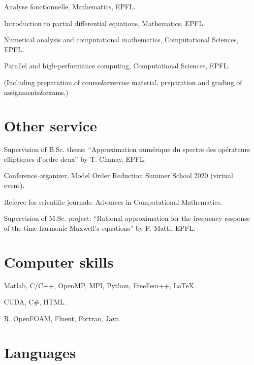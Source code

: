 \documentclass[11pt]{article} %
\begin{document}
\yearsminus Analyse fonctionnelle, Mathematics, EPFL.

Introduction to partial differential equations, Mathematics, EPFL.

Numerical analysis and computational mathematics, Computational Sciences, EPFL.

Parallel and high-performance computing, Computational Sciences, EPFL.

\smallskip

\hspace{-\leftskip}(Including preparation of course\&exercise material, preparation and grading of assignments\&exams.)

\section*{Other service}

\hspace{\parindent}Supervision of B.Sc. thesis: ``Approximation num\'erique du spectre des op\'erateurs elliptiques d'ordre deux'' by T. Chanay, EPFL.

Conference organizer, Model Order Reduction Summer School 2020 (virtual event).

\yearsminus Referee for scientific journals: Advances in Computational Mathematics.

Supervision of M.Sc. project: ``Rational approximation for the frequency response of the time-harmonic Maxwell's equations'' by F. Matti, EPFL.

\section*{Computer skills}

\hspace{\parindent}Matlab, C/C++, OpenMP, MPI, Python, FreeFem++, \LaTeX.

CUDA, C\#, HTML.

R, OpenFOAM, Fluent, Fortran, Java.


\section*{Languages}
\end{document}
